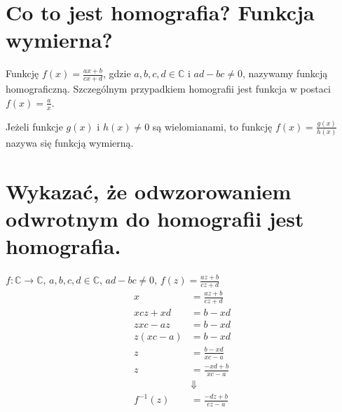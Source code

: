 \documentclass{article}
\numberwithin{equation}{section}
\theoremstyle{definition}
\theoremstyle{case}
\DeclareMathOperator{\tg}{tg}
\DeclareMathOperator{\ctg}{ctg}
\begin{document}
\begin{multicols}{2}
\end{multicols}

\section{Co to jest homografia? Funkcja wymierna?}
Funkcję $f(x) = \frac{ax+b}{cx+d}$, gdzie $a,b,c,d \in \mathbb{C}$ i $ad-bc \neq 0$, nazywamy funkcją homograficzną. Szczególnym przypadkiem homografii jest funkcja w postaci $f(x) = \frac{a}{x}$.

Jeżeli funkcje $g(x)$ i $h(x) \neq 0$ są wielomianami, to funkcję $f(x)=\frac{g(x)}{h(x)}$ nazywa się funkcją wymierną.

\section{Wykazać, że odwzorowaniem odwrotnym do homografii jest homografia.}
$f \colon \mathbb{C} \to \mathbb{C}$, $a,b,c,d \in \mathbb{C}$, $ad-bc \neq 0$, $f(z) = \frac{az+b}{cz+d}$
\begin{align*}
	x &= \frac{az+b}{cz+d}
	\\ xcz+xd &= b-xd
	\\ zxc-az &= b-xd
	\\ z(xc-a) &= b-xd
	\\ z &= \frac{b-xd}{xc-a}
	\\ z &= \frac{-xd+b}{xc-a}
	\\ &\Downarrow
	\\ f^{-1}(z) &= \frac{-dz+b}{cz-a}
\end{align*}
\end{document}
